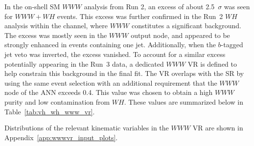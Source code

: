 In the on-shell SM $WWW$ analysis from Run 2, an excess of about 2.5~$\sigma$ was seen for $WWW + WH$ events. This excess was further confirmed in the Run~2 $WH$ analysis within the \zdep{} channel, where $WWW$ constitutes a significant background. The excess was mostly seen in the $WWW$ output node, and appeared to be strongly enhanced in events containing one jet. Additionally, when the $b$-tagged jet veto was inverted, the excess vanished. To account for a similar excess potentially appearing in the Run~3 data, a dedicated $WWW$ VR is defined to help constrain this background in the final fit. The VR overlaps with the \zdep{} SR by using the same event selection with an additional requirement that the $WWW$ node of the \zdep{} ANN exceeds 0.4. This value was chosen to obtain a high $WWW$ purity and low contamination from $WH$. These values are summarized below in Table~\ref{tab:vh_wh_www_vr}.

\begin{table}[htb]
    \centering
    \caption{Event yields in the Z-depleted SR from simulation as a function of minimum $WWW$ ANN output node score. The $WH$ signal and $WWW$ fractions are also provided. }\label{tab:vh_wh_www_vr}
\end{table}

Distributions of the relevant kinematic variables in the $WWW$ VR are shown in Appendix~\ref{app:wwwvr_input_plots}.